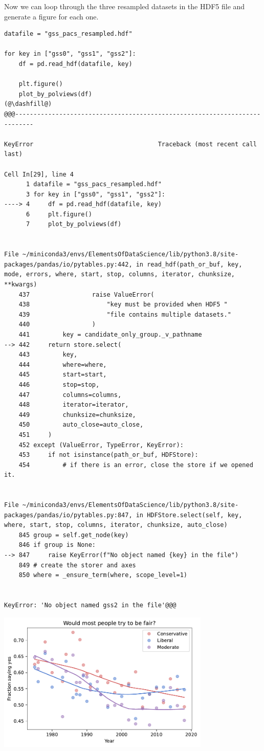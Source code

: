 Now we can loop through the three resampled datasets in the HDF5 file
and generate a figure for each one.

\begin{lstlisting}[]
datafile = "gss_pacs_resampled.hdf"

for key in ["gss0", "gss1", "gss2"]:
    df = pd.read_hdf(datafile, key)

    plt.figure()
    plot_by_polviews(df)
(@\dashfill@)
@@@---------------------------------------------------------------------------

KeyError                                  Traceback (most recent call last)

Cell In[29], line 4
      1 datafile = "gss_pacs_resampled.hdf"
      3 for key in ["gss0", "gss1", "gss2"]:
----> 4     df = pd.read_hdf(datafile, key)
      6     plt.figure()
      7     plot_by_polviews(df)


File ~/miniconda3/envs/ElementsOfDataScience/lib/python3.8/site-packages/pandas/io/pytables.py:442, in read_hdf(path_or_buf, key, mode, errors, where, start, stop, columns, iterator, chunksize, **kwargs)
    437                 raise ValueError(
    438                     "key must be provided when HDF5 "
    439                     "file contains multiple datasets."
    440                 )
    441         key = candidate_only_group._v_pathname
--> 442     return store.select(
    443         key,
    444         where=where,
    445         start=start,
    446         stop=stop,
    447         columns=columns,
    448         iterator=iterator,
    449         chunksize=chunksize,
    450         auto_close=auto_close,
    451     )
    452 except (ValueError, TypeError, KeyError):
    453     if not isinstance(path_or_buf, HDFStore):
    454         # if there is an error, close the store if we opened it.


File ~/miniconda3/envs/ElementsOfDataScience/lib/python3.8/site-packages/pandas/io/pytables.py:847, in HDFStore.select(self, key, where, start, stop, columns, iterator, chunksize, auto_close)
    845 group = self.get_node(key)
    846 if group is None:
--> 847     raise KeyError(f"No object named {key} in the file")
    849 # create the storer and axes
    850 where = _ensure_term(where, scope_level=1)


KeyError: 'No object named gss2 in the file'@@@
\end{lstlisting}

\begin{center}
\includegraphics[width=4in]{chapters/03_outlook_files/03_outlook_59_1.pdf}
\end{center}


